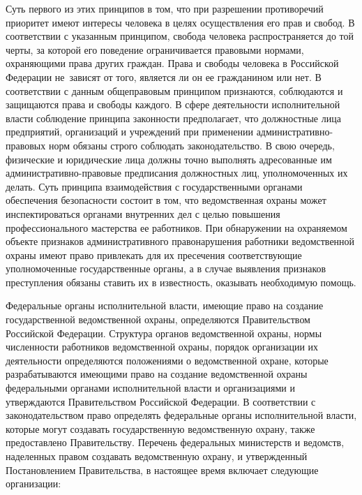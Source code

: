 \documentclass[a4paper,12pt,fleqn]{article} %
\begin{document}
Суть первого из этих принципов в том, что при разрешении противоречий приоритет имеют интересы человека в целях осуществления его прав и свобод. В соответствии с указанным принципом, свобода человека распространяется до той черты, за которой его поведение ограничивается правовыми нормами, охраняющими права других граждан. Права и свободы человека в Российской Федерации не~зависят от того, является ли он ее гражданином или нет. В соответствии с данным общеправовым принципом признаются, соблюдаются и защищаются права и свободы каждого. В сфере деятельности исполнительной власти соблюдение принципа законности предполагает, что должностные лица предприятий, организаций и учреждений при применении административно-правовых норм обязаны строго соблюдать законодательство. В свою очередь, физические и юридические лица должны точно выполнять адресованные им административно-правовые предписания должностных лиц, уполномоченных их делать. Суть принципа взаимодействия с государственными органами обеспечения безопасности состоит в том, что ведомственная охраны может инспектироваться органами внутренних дел с целью повышения профессионального мастерства ее работников. При обнаружении на охраняемом объекте признаков административного правонарушения работники ведомственной охраны имеют право привлекать для их пресечения соответствующие уполномоченные государственные органы, а в случае выявления признаков преступления обязаны ставить их в известность, оказывать необходимую помощь.

Федеральные органы исполнительной власти,  имеющие право на создание государственной ведомственной охраны, определяются Правительством Российской Федерации. Структура органов ведомственной охраны, нормы численности работников ведомственной охраны, порядок организации их деятельности определяются положениями о ведомственной охране, которые разрабатываются имеющими право на создание ведомственной охраны федеральными органами исполнительной власти и организациями и утверждаются Правительством Российской Федерации. В соответствии с законодательством право определять федеральные органы исполнительной власти, которые могут создавать государственную ведомственную охрану, также предоставлено Правительству. Перечень федеральных министерств и ведомств, наделенных правом создавать ведомственную охрану, и утвержденный Постановлением Правительства,   в настоящее время включает следующие организации:
\end{document}
